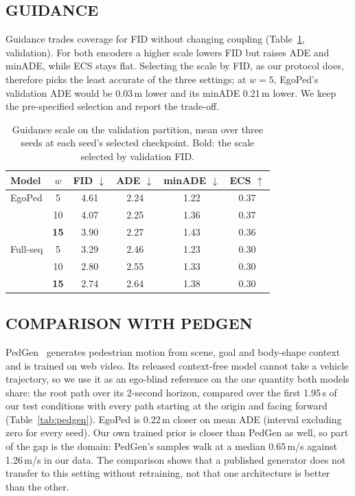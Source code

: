 \documentclass{ieeeoj}
\newcommand{\method}{EgoPed\xspace}
\newcommand{\fullseq}{Full-seq\xspace}
\begin{document}
\subsection{GUIDANCE}

Guidance trades coverage for FID without changing coupling (Table~\ref{tab:cfg}, validation). For both encoders a higher scale lowers FID but raises ADE and minADE, while ECS stays flat. Selecting the scale by FID, as our protocol does, therefore picks the least accurate of the three settings; at $w{=}5$, \method's validation ADE would be 0.03\,m lower and its minADE 0.21\,m lower. We keep the pre-specified selection and report the trade-off.

\begin{table}[t]
  \centering
  \caption{Guidance scale on the validation partition, mean over three seeds at each seed's selected checkpoint. Bold: the scale selected by validation FID.}
  \label{tab:cfg}
  \vspace{4pt}
  \footnotesize
  \begin{tabular}{lccccc}
    \toprule
    Model & $w$ & FID $\downarrow$ & ADE $\downarrow$ & minADE $\downarrow$ & ECS $\uparrow$ \\
    \midrule
    \method & 5 & 4.61 & 2.24 & 1.22 & 0.37 \\
            & 10 & 4.07 & 2.25 & 1.36 & 0.37 \\
            & \textbf{15} & 3.90 & 2.27 & 1.43 & 0.36 \\
    \midrule
    \fullseq & 5 & 3.29 & 2.46 & 1.23 & 0.30 \\
             & 10 & 2.80 & 2.55 & 1.33 & 0.30 \\
             & \textbf{15} & 2.74 & 2.64 & 1.38 & 0.30 \\
    \bottomrule
  \end{tabular}
\end{table}

\subsection{COMPARISON WITH PEDGEN}
\label{sec:pedgen}

PedGen~\cite{liu2025pedgen} generates pedestrian motion from scene, goal and body-shape context and is trained on web video. Its released context-free model cannot take a vehicle trajectory, so we use it as an ego-blind reference on the one quantity both models share: the root path over its 2-second horizon, compared over the first 1.95\,s of our test conditions with every path starting at the origin and facing forward (Table~\ref{tab:pedgen}). \method is 0.22\,m closer on mean ADE (interval excluding zero for every seed). Our own trained prior is closer than PedGen as well, so part of the gap is the domain: PedGen's samples walk at a median 0.65\,m/s against 1.26\,m/s in our data. The comparison shows that a published generator does not transfer to this setting without retraining, not that one architecture is better than the other.
\end{document}
